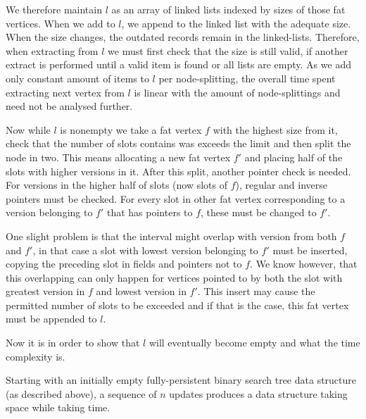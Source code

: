 We therefore maintain $l$ as an array of linked lists indexed by sizes of those fat vertices. When we add to $l$, we append to the linked list with the adequate size. When the size changes, the outdated records remain in the linked-lists. Therefore, when extracting from $l$ we must first check that the size is still valid, if another extract is performed until a valid item is found or all lists are empty. As we add only constant amount of items to $l$ per node-splitting, the overall time spent extracting next vertex from $l$ is linear with the amount of node-splittings and need not be analysed further.

Now while $l$ is nonempty we take a fat vertex $f$ with the highest size from it, check that the number of slots contains was exceeds the limit and then split the node in two. This means allocating a new fat vertex $f'$ and placing half of the slots with higher versions in it. After this split, another pointer check is needed. For versions in the higher half of slots (now slots of $f$), regular and inverse pointers must be checked. For every slot in other fat vertex corresponding to a version belonging to $f'$  that has pointers to $f$, these must be changed to $f'$. 

One slight problem is that the interval might overlap with version from both $f$ and $f'$, in that case a slot with lowest version belonging to $f'$ must be inserted, copying the preceding slot in fields and pointers not to $f$. We know however, that this overlapping can only happen for vertices pointed to by both the slot with greatest version in $f$ and lowest version in $f'$. This insert may cause the permitted number of slots to be exceeded and if that is the case, this fat vertex must be appended to $l$.

Now it is in order to show that $l$ will eventually become empty and what the time complexity is.

\begin{prop}
Starting with an initially empty fully-persistent binary search tree data structure (as described above), a sequence of $n$ updates produces a data structure taking  space while taking  time.
\end{prop}


